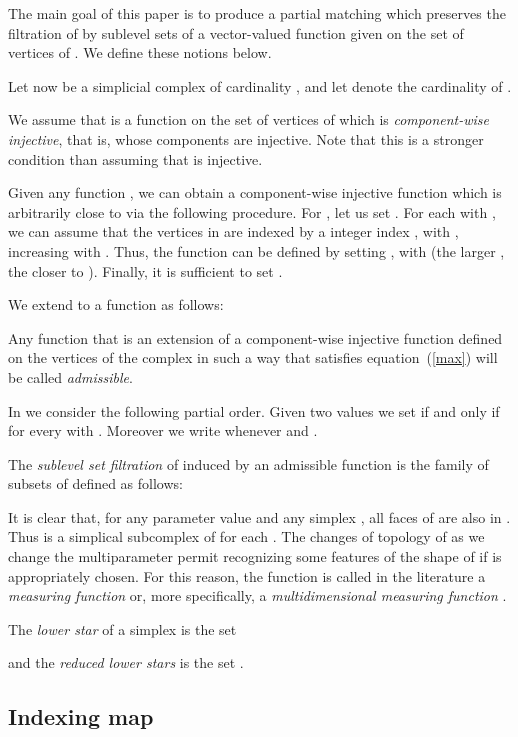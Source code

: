 \documentclass[12pt]{article}
\begin{document}
The main goal of this paper is to produce a partial matching which preserves the filtration of  by sublevel sets of a vector-valued function  given on the set of vertices of . We define these notions below.

\medskip

Let now  be a  simplicial complex of cardinality , and let  denote the cardinality of .

We assume that  is a function  on the set of vertices of  which is {\em component-wise injective},
that is, whose components  are injective. Note that  this is a stronger condition than assuming that  is injective.


Given any function , we can obtain a component-wise injective function  which is arbitrarily
close to  via the following procedure.
For , let us set .
For each  with , we can assume that the  vertices in  are indexed by a integer index , with , increasing with . Thus, the
function   can be  defined by setting , with 
(the larger , the closer  to ). Finally, it is sufficient to set .

We extend  to a function  as follows:



Any function   that is an extension of a component-wise injective function  defined on
the vertices of the complex  in such a way that  satisfies equation~(\ref{max}) will be called \emph{admissible}.

\medskip

In  we consider the following partial order. Given two values  we set  if and only if
 for every  with . Moreover we write  whenever  and .


The {\em sublevel set filtration} of  induced by an admissible function  is the family  of subsets of  defined as follows:

It is clear that, for any parameter value  and any simplex , all faces of  are also in . Thus  is a simplical subcomplex of  for each . The changes of topology of  as we change the multiparameter  permit recognizing some features of the shape of   if  is appropriately chosen. For this reason, the function  is called in the literature a {\em measuring function} or, more specifically, a {\em multidimensional measuring function} \cite{BiCe*08}.

\medskip

The {\em lower star} of a simplex is the set

and the {\em reduced lower stars} is the set
.

\subsection{Indexing map}
\end{document}
